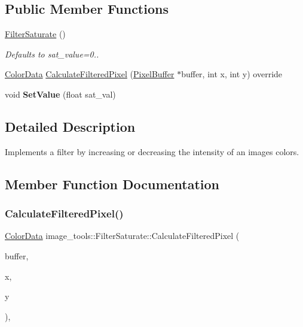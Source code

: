 \subsection*{Public Member Functions}
\begin{DoxyCompactItemize}
\item 
\mbox{\label{classimage__tools_1_1FilterSaturate_adb9cbb52d0cbcbb301eebcbced82bd3d}} 
\hyperlink{classimage__tools_1_1FilterSaturate_adb9cbb52d0cbcbb301eebcbced82bd3d}{Filter\+Saturate} ()
\begin{DoxyCompactList}\small\item\em Defaults to sat\+\_\+value=0.. \end{DoxyCompactList}\item 
\hyperlink{classimage__tools_1_1ColorData}{Color\+Data} \hyperlink{classimage__tools_1_1FilterSaturate_a86ab1b87e52a5f9b5c8642531ed7fdc6}{Calculate\+Filtered\+Pixel} (\hyperlink{classimage__tools_1_1PixelBuffer}{Pixel\+Buffer} $\ast$buffer, int x, int y) override
\item 
\mbox{\label{classimage__tools_1_1FilterSaturate_a31182a6d8f384ac6d73c8367d1776535}} 
void {\bfseries Set\+Value} (float sat\+\_\+val)
\end{DoxyCompactItemize}


\subsection{Detailed Description}
Implements a filter by increasing or decreasing the intensity of an image\textquotesingle{}s colors. 

\subsection{Member Function Documentation}
\mbox{\label{classimage__tools_1_1FilterSaturate_a86ab1b87e52a5f9b5c8642531ed7fdc6}} 
\subsubsection{\texorpdfstring{Calculate\+Filtered\+Pixel()}{CalculateFilteredPixel()}}
{\footnotesize\ttfamily \hyperlink{classimage__tools_1_1ColorData}{Color\+Data} image\+\_\+tools\+::\+Filter\+Saturate\+::\+Calculate\+Filtered\+Pixel (\begin{DoxyParamCaption}\item[{\hyperlink{classimage__tools_1_1PixelBuffer}{Pixel\+Buffer} $\ast$}]{buffer,  }\item[{int}]{x,  }\item[{int}]{y }\end{DoxyParamCaption})\hspace{0.3cm}{\ttfamily [override]}, {\ttfamily [virtual]}}

